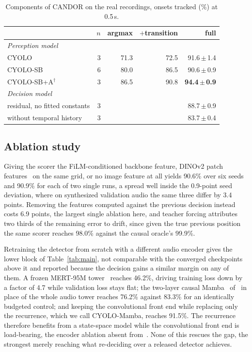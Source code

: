 \documentclass{article}
\newcommand{\sys}{CANDOR}
\begin{document}
\begin{table}[t]
\centering
\caption{Components of \sys{} on the real recordings, onsets tracked (\%)
at 0.5\,s.}
\label{tab:transfer}
\setlength{\tabcolsep}{4pt}
{\footnotesize
\begin{tabular}{lrrrr}
\toprule
 & $n$ & argmax & $+$transition & full \\
\midrule
\multicolumn{5}{l}{\emph{Perception model}}\\
CYOLO~\cite{henkel2021eusipco}          & 3 & 71.3 & 72.5 & 91.6\,$\pm$\,1.4 \\
CYOLO-SB~\cite{henkel2021frontiers}     & 6 & 80.0 & 86.5 & 90.6\,$\pm$\,0.9 \\
CYOLO-SB+A$^\dagger$                    & 3 & 86.5 & 90.8 & \textbf{94.4\,$\pm$\,0.9} \\
\midrule
\multicolumn{5}{l}{\emph{Decision model}}\\
residual, no fitted constants           & 3 &      &      & 88.7\,$\pm$\,0.9 \\
without temporal history                & 3 &      &      & 83.7\,$\pm$\,0.4 \\
\bottomrule
\end{tabular}}
\end{table}



\subsection{Ablation study}
\label{ssec:abl}

Giving the scorer the FiLM-conditioned backbone feature, DINOv2 patch
features~\cite{oquab2024dinov2} on the same grid, or no image feature at all
yields 90.6\% over six seeds and 90.9\% for each of two single runs, a spread
well inside the 0.9-point seed deviation,
where on synthesized validation audio the same three differ by 3.4 points.
Removing the features computed against the previous decision instead costs 6.9
points, the largest single ablation here, and teacher forcing attributes two
thirds of the remaining error to drift, since given the true previous position
the same scorer reaches 98.0\% against the causal oracle's 99.9\%.

Retraining the detector from scratch with a different audio encoder
gives the lower block of Table~\ref{tab:main}, not comparable with the
converged checkpoints above it and reported because the decision gains a
similar margin on any of them. A frozen MERT-95M tower~\cite{li2024mert}
reaches 46.2\%, driving training loss down by a factor of 4.7 while validation
loss stays flat; the two-layer causal Mamba~\cite{gu2024mamba}
of~\cite{yang2026coda} in place of the whole audio tower reaches 76.2\% against
83.3\% for an identically budgeted control; and keeping the convolutional front
end while replacing only the recurrence, which we call CYOLO-Mamba, reaches
91.5\%. The recurrence therefore benefits from a state-space model while the
convolutional front end is load-bearing, the encoder ablation absent
from~\cite{yang2026coda}. None of this rescues the gap, the strongest
merely reaching what re-deciding over a released detector achieves.
\end{document}
